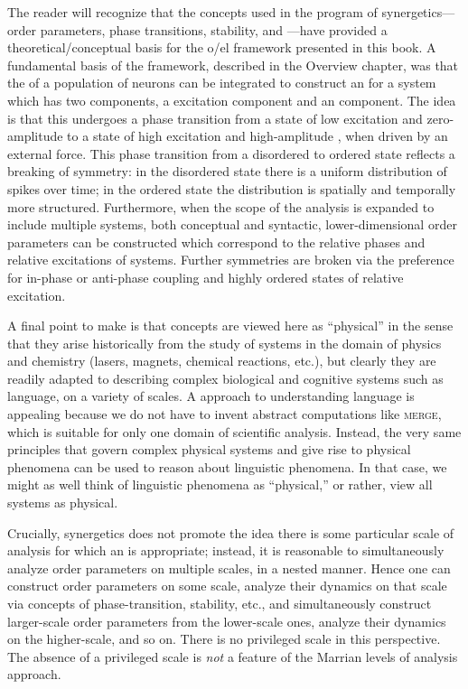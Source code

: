   The reader will recognize that the concepts used in the program of synergetics—order parameters, phase transitions, stability, and —have provided a theoretical/conceptual basis for the o/el framework presented in this book. A fundamental basis of the framework, described in the Overview chapter, was that the  of a population of neurons can be integrated to construct an  for a system which has two components, a excitation component and an  component. The idea is that this  undergoes a phase transition from a state of low excitation and zero-amplitude  to a state of high excitation and high-amplitude , when driven by an external force. This phase transition from a disordered to ordered state reflects a breaking of symmetry: in the disordered state there is a uniform distribution of spikes over time; in the ordered state the distribution is spatially and temporally more structured. Furthermore, when the scope of the analysis is expanded to include multiple systems, both conceptual and syntactic, lower-dimensional order parameters can be constructed which correspond to the relative phases and relative excitations of systems. Further symmetries are broken via the preference for in-phase or anti-phase coupling and highly ordered states of relative excitation.

A final point to make is that  concepts are viewed here as “physical” in the sense that they arise historically from the study of systems in the domain of physics and chemistry (lasers, magnets, chemical reactions, etc.), but clearly they are readily adapted to describing complex biological and cognitive systems such as language, on a variety of scales. A  approach to understanding language is appealing because we do not have to invent abstract computations like \textsc{merge}, which is suitable for only one domain of scientific analysis. Instead, the very same principles that govern complex physical systems and give rise to physical phenomena can be used to reason about linguistic phenomena. In that case, we might as well think of linguistic phenomena as “physical,” or rather, view all systems as physical.

 Crucially, synergetics does not promote the idea there is some particular scale of analysis for which an  is appropriate; instead, it is reasonable to simultaneously analyze order parameters on multiple scales, in a nested manner. Hence one can construct order parameters on some scale, analyze their dynamics on that scale via concepts of phase-transition, stability, etc., and simultaneously construct larger-scale order parameters from the lower-scale ones, analyze their dynamics on the higher-scale, and so on. There is no privileged scale in this perspective. The absence of a privileged scale is \textit{not} a feature of the Marrian levels of analysis approach.

